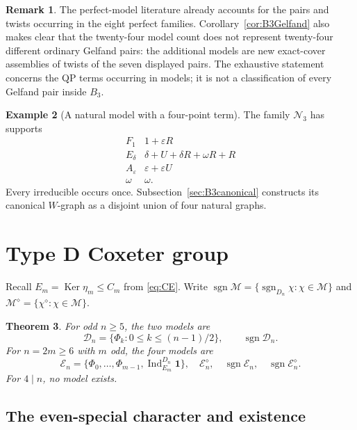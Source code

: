 \documentclass[11pt]{article}
\numberwithin{equation}{section}
\newtheorem{theorem}{Theorem}[section]
\theoremstyle{definition}
\newtheorem{example}[theorem]{Example}
\newtheorem{remark}[theorem]{Remark}
\DeclareMathOperator{\Ind}{Ind}
\DeclareMathOperator{\sgn}{sgn}
\DeclareMathOperator{\Ker}{Ker}
\newcommand{\ee}{\varepsilon}
\newcommand{\dd}{\delta}
\newcommand{\om}{\omega}
\newcommand{\one}{\mathbf 1}
\newcommand{\diagauto}{\diamond}
\begin{document}
\begin{remark}
The perfect-model literature \cite{MZgraphs,MZperfect} already
accounts for the pairs and twists occurring in the eight perfect
families.  Corollary~\ref{cor:B3Gelfand} also makes clear that the
twenty-four model count does not represent twenty-four different
ordinary Gelfand pairs: the additional models are new exact-cover
assemblies of twists of the seven displayed pairs.
The exhaustive statement concerns the QP terms occurring in models;
it is not a classification of every Gelfand pair inside \(B_3\).
\end{remark}



\begin{example}[A natural model with a four-point term]
The family \(\mathscr N_3\) has supports
\[
 \begin{array}{c|l}
 F_1&1+\ee R\\
 E_\dd&\dd+U+\dd R+\om R+R\\
 A_\ee&\ee+\ee U\\
 \om&\om .
 \end{array}
\]
Every irreducible occurs once.
Subsection~\ref{sec:B3canonical} constructs its canonical \(W\)-graph as a disjoint union of four natural graphs.
\end{example}
\section{Type D Coxeter group}
\label{sec:D}

Recall \(E_m=\Ker\eta_m\leq C_m\) from \eqref{eq:CE}.
Write \(\sgn\mathcal M=\{\sgn_{D_n}\chi:\chi\in\mathcal M\}\) and
\(\mathcal M^\diagauto=\{\chi^\diagauto:\chi\in\mathcal M\}\).

\begin{theorem}\label{thm:D}
For odd \(n\geq5\), the two models are
\[
 \mathcal D_n=\{\Phi_k:0\leq k\leq(n-1)/2\},\qquad
 \sgn\mathcal D_n.
\]
For \(n=2m\geq6\) with \(m\) odd, the four models are
\begin{equation}
 \mathcal E_n=\{\Phi_0,\ldots,\Phi_{m-1},\Ind_{E_m}^{D_n}\one\},
 \quad \mathcal E_n^\diagauto,\quad
 \sgn\mathcal E_n,\quad \sgn\mathcal E_n^\diagauto .
 \label{eq:Dmodels}
\end{equation}
For \(4\mid n\), no model exists.
\end{theorem}

\subsection{The even-special character and existence}
\end{document}
